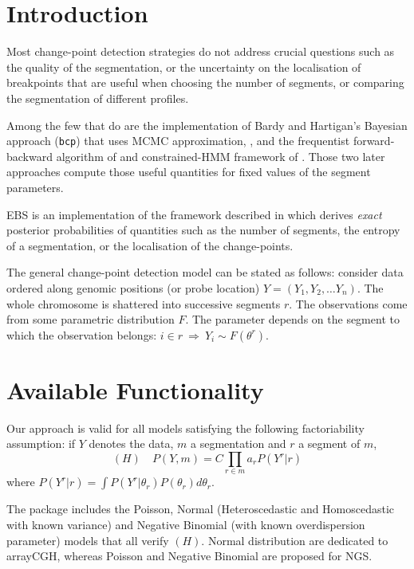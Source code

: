 \documentclass{bioinfo}
\begin{document}
\begin{methods}
\section{Introduction}

 Most change-point detection strategies do not address crucial questions such as the quality of the segmentation, or the uncertainty on the localisation of breakpoints that are useful when choosing the number of segments, or comparing the segmentation of different profiles. 

Among the few that do are the implementation of Bardy and Hartigan's Bayesian approach (\texttt{bcp}) that uses MCMC approximation, \citep{barry_hartigan, bcp_package}, and the frequentist forward-backward algorithm of \cite{guedon_2008} and constrained-HMM framework of  \cite{Luong_HMM_2012}. Those two later approaches compute those useful quantities for fixed values of the segment parameters.

EBS is an implementation of the framework described in \cite{rigaill_exact_2011} which derives \textit{exact} posterior probabilities of quantities such as the number of segments, the entropy of a segmentation, or the localisation of the change-points.

The general change-point detection model can be stated as
  follows: consider data ordered along genomic positions (or probe
  location) $Y = (Y_1, Y_2, \dots Y_n)$. The whole chromosome is
  shattered into successive segments $r$. The observations come from
  some parametric distribution $F$. The parameter depends on the
  segment to which the observation belongs: $i \in r \: \Rightarrow \: Y_i
  \sim F(\theta^r)$.


\section{Available Functionality}
Our approach is valid for all models satisfying the following factoriability
assumption: if $Y$ denotes the data, $m$ a segmentation and $r$ a
segment of $m$,
\begin{equation}
 (H)\quad P(Y,m) = C \prod_{r\in m} a_r P(Y^r|r) \label{factoriability}
\end{equation}
where $P(Y^r|r) =\int P(Y^r|\theta_r)P(\theta_r)d\theta_r $.

The package includes the Poisson, Normal (Heteroscedastic and Homoscedastic with known variance) and Negative
Binomial (with known overdispersion parameter) models that all verify
$(H)$. Normal distribution are dedicated to arrayCGH, whereas Poisson and Negative Binomial are proposed for NGS.


\end{methods}
\end{document}
